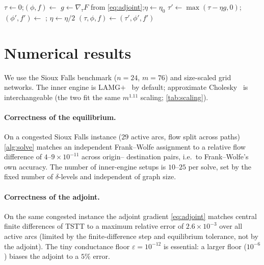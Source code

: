 \documentclass[ijoc]{informs3}
\begin{document}
\begin{algorithm}
\caption{Bilevel toll design}\label{alg:design}
\begin{algorithmic}[1]
\State $\tau\gets0$;\quad $(\phi,f)\gets$  
  \State $g\gets\nabla_\tau F$ from \cref{eq:adjoint};\quad $\eta\gets\eta_0$
  \Repeat {}
    \State $\tau'\gets\max(\tau-\eta g,0)$; $(\phi',f')\gets$ ; $\eta\gets\eta/2$
  \State $(\tau,\phi,f)\gets(\tau',\phi',f')$
\EndFor
\end{algorithmic}
\end{algorithm}

\section{Numerical results}\label{sec:results}
We use the Sioux Falls benchmark ($n=24$, $m=76$) and size-scaled grid networks. The inner engine is
LAMG$+$~\citep{lamgplus} by default; approximate Cholesky~\citep{kyngsachdeva2016} is interchangeable (the two
fit the same $m^{1.11}$ scaling; \cref{tab:scaling}).

\paragraph{Correctness of the equilibrium.}
On a congested Sioux Falls instance ($29$ active arcs, flow split across paths) \cref{alg:solve} matches an
independent Frank--Wolfe assignment to a relative flow difference of $4$--$9\times10^{-11}$ across origin--
destination pairs, i.e.\ to Frank--Wolfe's own accuracy. The number of inner-engine setups is $10$--$25$
per solve, set by the fixed number of $\delta$-levels and independent of graph size.

\paragraph{Correctness of the adjoint.}
On the same congested instance the adjoint gradient \cref{eq:adjoint} matches central finite differences of TSTT
to a maximum relative error of $2.6\times10^{-3}$ over all active arcs (limited by the finite-difference step and
equilibrium tolerance, not by the adjoint). The tiny conductance floor $\varepsilon=10^{-12}$ is essential: a
larger floor ($10^{-6}$) biases the adjoint to a $5\%$ error.
\end{document}
